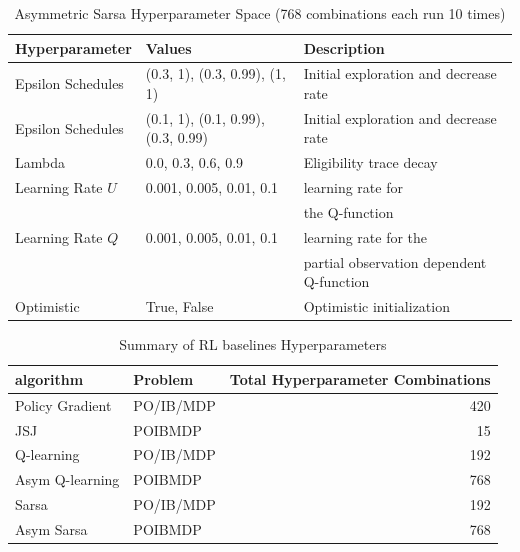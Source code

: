 \begin{table}[h]
\centering
\small
\caption{Asymmetric Sarsa Hyperparameter Space (768 combinations each run 10 times)}\label{tab:hp-sarsa}
\begin{tabular}{lll}
\toprule
\textbf{Hyperparameter} & \textbf{Values} & \textbf{Description} \\
\midrule
Epsilon Schedules & (0.3, 1), (0.3, 0.99), (1, 1) & Initial exploration and decrease rate \\
Epsilon Schedules & (0.1, 1), (0.1, 0.99), (0.3, 0.99) & Initial exploration and decrease rate \\
Lambda & 0.0, 0.3, 0.6, 0.9 & Eligibility trace decay \\
Learning Rate $U$ & 0.001, 0.005, 0.01, 0.1 & learning rate for \\
 & & the Q-function \\
Learning Rate $Q$ & 0.001, 0.005, 0.01, 0.1 & learning rate for the \\
 & & partial observation dependent Q-function \\
Optimistic & True, False & Optimistic initialization \\
\bottomrule
\end{tabular}
\end{table}

\begin{table}[h]
    \centering
    \caption{Summary of RL baselines Hyperparameters}
    \begin{tabular}{llr}
    \toprule
    \textbf{algorithm} & \textbf{Problem} & \textbf{Total Hyperparameter Combinations} \\
    \midrule
    Policy Gradient & PO/IB/MDP & 420 \\
    JSJ & POIBMDP & 15 \\
    Q-learning & PO/IB/MDP & 192 \\
    Asym Q-learning & POIBMDP & 768 \\
    Sarsa & PO/IB/MDP & 192 \\
    Asym Sarsa & POIBMDP & 768 \\
    \bottomrule
    \end{tabular}
    \end{table}


